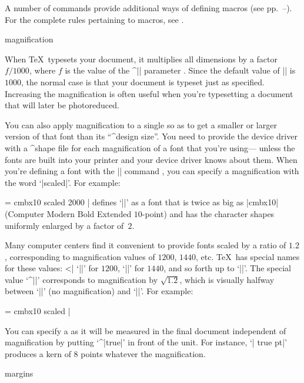 {{{{{{{{{{{A number of commands provide additional ways of defining macros
(see pp.~--).
For the complete rules pertaining to macros, see .
}%
\endconcept


\concept magnification

When \TeX\ typesets your document, it multiplies all dimensions 
by a 
 factor $f/1000$,
where $f$ is the value of the ^|\mag| parameter \ctsref\mag.
Since the default value of |\mag| is $1000$, the normal case is that
your document is typeset just as specified.
Increasing the magnification is often useful when you're typesetting a document
that will later be photoreduced.

You can also apply magnification to a single  so as to get
a smaller or larger version of that font than its ``^{design size}''.  You
need to provide the device driver with a ^{shape file}
 for 
each magnification of a font that you're using---%
unless the fonts are built into your printer and your device driver
knows about them.
When you're defining a font with
the |\font| command \ctsref{\font}, you can specify a magnification with
the word `|scaled|'.  For example:

\csdisplay
\font\largerbold = cmbx10 scaled 2000
|
defines `|\largerbold|' as a font that is
twice as big as |cmbx10| (Computer Modern
Bold Extended $10$-point) and has the character shapes
uniformly enlarged by a factor of~$2$.

Many computer centers find it convenient to provide fonts scaled by a ratio
of $1.2$, corresponding to magnification values of $1200$, $1440$, etc.  
\TeX\ has special names for these values:
^^|\magstep|
`||' for $1200$,
`||' for $1440$, and so forth up to `||'.  The special
value `^|\magstephalf|' corresponds to magnification by $\sqrt{1.2}$, which
is visually halfway between `||' (no magnification) and
`||'.  For example:

\csdisplay
\font\bigbold = cmbx10 scaled \magstephalf
|

You can specify a  as it will be
measured in the final document independent of magnification by putting
`^|true|' in front of the unit.  For instance, `| true pt|' 
produces a kern of $8$ points whatever the magnification. 

\endconcept

\concept margins

}}}}}}}}}}
